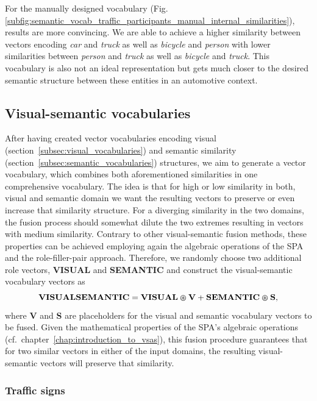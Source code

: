 For the manually designed vocabulary (Fig. \ref{subfig:semantic_vocab_traffic_participants_manual_internal_similarities}), results are more convincing.
We are able to achieve a higher similarity between vectors encoding \emph{car} and \emph{truck} as well as \emph{bicycle} and \emph{person} with lower similarities between \emph{person} and \emph{truck} as well as \emph{bicycle} and \emph{truck}.
This vocabulary is also not an ideal representation but gets much closer to the desired semantic structure between these entities in an automotive context. 

\subsection{Visual-semantic vocabularies}%
\label{subsec:visual_semantic_vocabularies}
 
After having created vector vocabularies encoding visual (section~\ref{subsec:visual_vocabularies}) and semantic similarity (section~\ref{subsec:semantic_vocabularies}) structures, we aim to generate a vector vocabulary, which combines both aforementioned similarities in one comprehensive vocabulary.
The idea is that for high or low similarity in both, visual and semantic domain we want the resulting vectors to preserve or even increase that similarity structure.
For a diverging similarity in the two domains, the fusion process should somewhat dilute the two extremes resulting in vectors with medium similarity.
Contrary to other visual-semantic fusion methods, these properties can be achieved employing again the algebraic operations of the \ac{SPA} and the role-filler-pair approach.
Therefore, we randomly choose two additional role vectors, \textbf{VISUAL} and \textbf{SEMANTIC} and construct the visual-semantic vocabulary vectors as
\begin{equation}
\label{eq:visual_semantic_vocab}
\mathbf{VISUALSEMANTIC} = \mathbf{VISUAL} \varoast \mathbf{V} + \mathbf{SEMANTIC} \varoast \mathbf{S},
\end{equation}
where \textbf{V} and \textbf{S} are placeholders for the visual and semantic vocabulary vectors to be fused.
Given the mathematical properties of the \ac{SPA}'s algebraic operations (cf.\ chapter~\ref{chap:introduction_to_vsas}), this fusion procedure guarantees that for two similar vectors in either of the input domains, the resulting visual-semantic vectors will preserve that similarity.

\subsubsection{Traffic signs}%
\label{ssubsec:traffic_signs}

